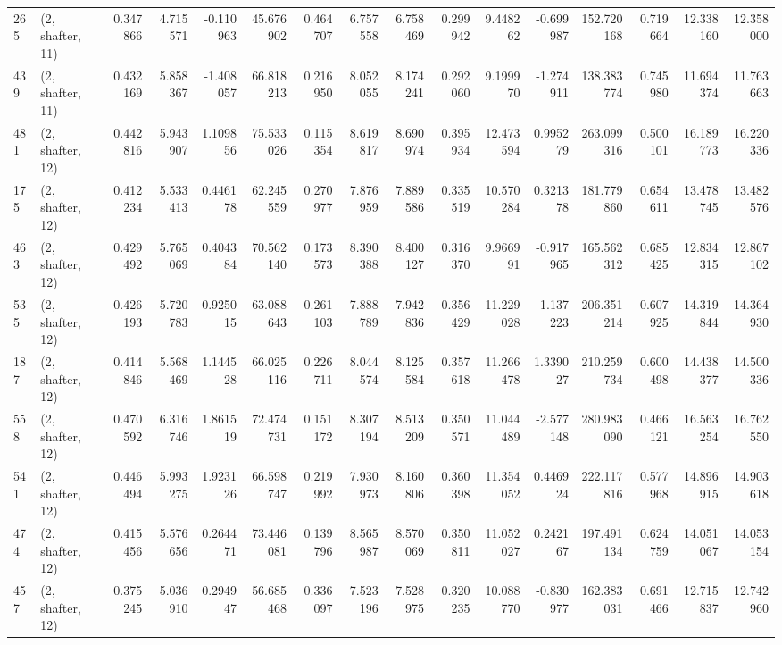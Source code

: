 \begin{tabular}{llrrrrrrrrrrrrrr}
265 &  (2, shafter, 11) &   0.347866 &   4.715571 &  -0.110963 &    45.676902 &   0.464707 &   6.757558 &   6.758469 &  0.299942 &   9.448262 &  -0.699987 &   152.720168 &  0.719664 &  12.338160 &  12.358000 \\
439 &  (2, shafter, 11) &   0.432169 &   5.858367 &  -1.408057 &    66.818213 &   0.216950 &   8.052055 &   8.174241 &  0.292060 &   9.199970 &  -1.274911 &   138.383774 &  0.745980 &  11.694374 &  11.763663 \\
481 &  (2, shafter, 12) &   0.442816 &   5.943907 &   1.109856 &    75.533026 &   0.115354 &   8.619817 &   8.690974 &  0.395934 &  12.473594 &   0.995279 &   263.099316 &  0.500101 &  16.189773 &  16.220336 \\
175 &  (2, shafter, 12) &   0.412234 &   5.533413 &   0.446178 &    62.245559 &   0.270977 &   7.876959 &   7.889586 &  0.335519 &  10.570284 &   0.321378 &   181.779860 &  0.654611 &  13.478745 &  13.482576 \\
463 &  (2, shafter, 12) &   0.429492 &   5.765069 &   0.404384 &    70.562140 &   0.173573 &   8.390388 &   8.400127 &  0.316370 &   9.966991 &  -0.917965 &   165.562312 &  0.685425 &  12.834315 &  12.867102 \\
535 &  (2, shafter, 12) &   0.426193 &   5.720783 &   0.925015 &    63.088643 &   0.261103 &   7.888789 &   7.942836 &  0.356429 &  11.229028 &  -1.137223 &   206.351214 &  0.607925 &  14.319844 &  14.364930 \\
187 &  (2, shafter, 12) &   0.414846 &   5.568469 &   1.144528 &    66.025116 &   0.226711 &   8.044574 &   8.125584 &  0.357618 &  11.266478 &   1.339027 &   210.259734 &  0.600498 &  14.438377 &  14.500336 \\
558 &  (2, shafter, 12) &   0.470592 &   6.316746 &   1.861519 &    72.474731 &   0.151172 &   8.307194 &   8.513209 &  0.350571 &  11.044489 &  -2.577148 &   280.983090 &  0.466121 &  16.563254 &  16.762550 \\
541 &  (2, shafter, 12) &   0.446494 &   5.993275 &   1.923126 &    66.598747 &   0.219992 &   7.930973 &   8.160806 &  0.360398 &  11.354052 &   0.446924 &   222.117816 &  0.577968 &  14.896915 &  14.903618 \\
474 &  (2, shafter, 12) &   0.415456 &   5.576656 &   0.264471 &    73.446081 &   0.139796 &   8.565987 &   8.570069 &  0.350811 &  11.052027 &   0.242167 &   197.491134 &  0.624759 &  14.051067 &  14.053154 \\
457 &  (2, shafter, 12) &   0.375245 &   5.036910 &   0.294947 &    56.685468 &   0.336097 &   7.523196 &   7.528975 &  0.320235 &  10.088770 &  -0.830977 &   162.383031 &  0.691466 &  12.715837 &  12.742960 \\

\end{tabular}
